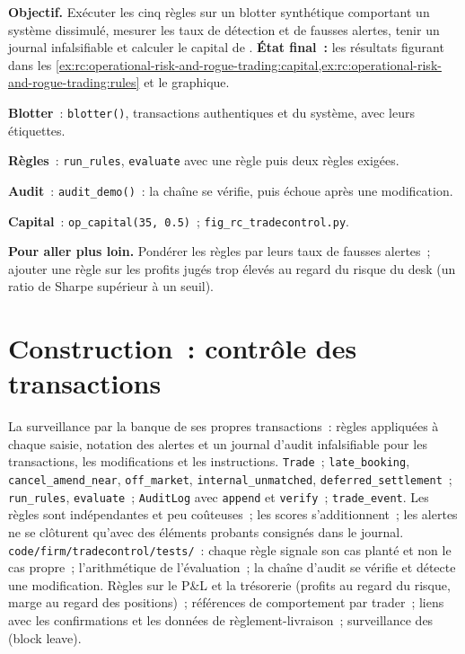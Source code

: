 \begin{tutorial}
\textbf{Objectif.} Exécuter les cinq règles sur un blotter synthétique comportant un système dissimulé, mesurer les taux de détection et de fausses alertes,
tenir un journal infalsifiable et calculer le capital de . \textbf{État final~:} les résultats figurant dans les
\cref{ex:rc:operational-risk-and-rogue-trading:capital,ex:rc:operational-risk-and-rogue-trading:rules}
et le graphique.
\begin{tutsteps}
\item \textbf{Blotter}~: \texttt{blotter()}, transactions authentiques et du système, avec leurs étiquettes.
\item \textbf{Règles}~: \texttt{run\_rules}, \texttt{evaluate} avec une règle puis deux règles exigées.
\item \textbf{Audit}~: \texttt{audit\_demo()}~: la chaîne se vérifie, puis échoue après une modification.
\item \textbf{Capital}~: \texttt{op\_capital(35, 0.5)}~; \texttt{fig\_rc\_tradecontrol.py}.
\end{tutsteps}
\textbf{Pour aller plus loin.} Pondérer les règles par leurs taux de fausses alertes~; ajouter une règle sur les profits jugés trop élevés
au regard du risque du desk (un ratio de Sharpe supérieur à un seuil).
\end{tutorial}

\section{Construction~: contrôle des transactions}\label{bld:rc:operational-risk-and-rogue-trading:tradecontrol}

\begin{build}
 La surveillance par la banque de ses propres transactions~: règles appliquées à chaque saisie, notation des alertes et
un journal d'audit infalsifiable pour les transactions, les modifications et les instructions.
 \texttt{Trade}~; \texttt{late\_booking}, \texttt{cancel\_amend\_near}, \texttt{off\_market},
\texttt{internal\_unmatched}, \texttt{deferred\_settlement}~; \texttt{run\_rules}, \texttt{evaluate}~;
\texttt{AuditLog} avec \texttt{append} et \texttt{verify}~; \texttt{trade\_event}.
 Les règles sont indépendantes et peu coûteuses~; les scores s'additionnent~; les alertes ne se clôturent qu'avec des éléments probants consignés
dans le journal.
 \texttt{code/firm/tradecontrol/tests/}~: chaque règle signale son cas planté et non
le cas propre~; l'arithmétique de l'évaluation~; la chaîne d'audit se vérifie et détecte une modification.
 Règles sur le P\&L et la trésorerie (profits au regard du risque, marge au regard des positions)~; références
de comportement par trader~; liens avec les confirmations et les données de règlement-livraison~; surveillance des  (block leave).
\end{build}

